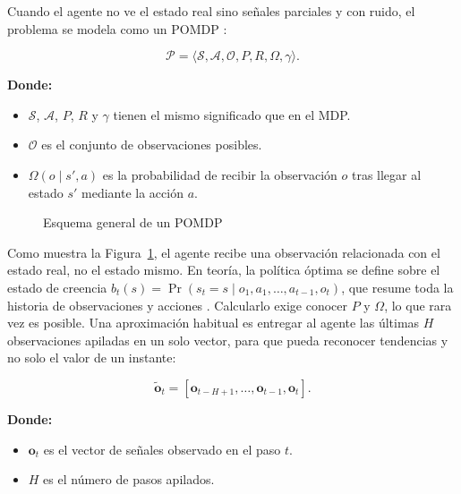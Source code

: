 Cuando el agente no ve el estado real sino señales parciales y con ruido, el problema se
modela como un POMDP \cite{kaelbling1998pomdp}:

\begin{equation}
    \mathcal{P} = \langle \mathcal{S}, \mathcal{A}, \mathcal{O}, P, R, \Omega, \gamma \rangle.
    \label{eq:pomdp_tuple}
\end{equation}

\noindent\textbf{Donde:}
\begin{itemize}
    \item $\mathcal{S}$, $\mathcal{A}$, $P$, $R$ y $\gamma$ tienen el mismo significado que en el MDP.
    \item $\mathcal{O}$ es el conjunto de observaciones posibles.
    \item $\Omega(o \mid s', a)$ es la probabilidad de recibir la observación $o$ tras llegar al estado $s'$ mediante la acción $a$.
\end{itemize}

\begin{figure}[H]
    \centering
    
    \caption{Esquema general de un POMDP}
    \label{fig:pomdp}
\end{figure}

Como muestra la Figura~\ref{fig:pomdp}, el agente recibe una observación relacionada con el
estado real, no el estado mismo. En teoría, la política óptima se define sobre el estado de
creencia $b_t(s) = \Pr(s_t = s \mid o_1, a_1, \ldots, a_{t-1}, o_t)$, que resume toda la
historia de observaciones y acciones \cite{kaelbling1998pomdp}. Calcularlo exige conocer
$P$ y $\Omega$, lo que rara vez es posible. Una aproximación habitual es entregar al agente
las últimas $H$ observaciones apiladas en un solo vector, para que pueda reconocer
tendencias y no solo el valor de un instante:

\begin{equation}
    \tilde{\mathbf{o}}_t = \left[\mathbf{o}_{t-H+1}, \ldots, \mathbf{o}_{t-1}, \mathbf{o}_t\right].
    \label{eq:stacked_observation}
\end{equation}

\noindent\textbf{Donde:}
\begin{itemize}
    \item $\mathbf{o}_t$ es el vector de señales observado en el paso $t$.
    \item $H$ es el número de pasos apilados.
\end{itemize}

